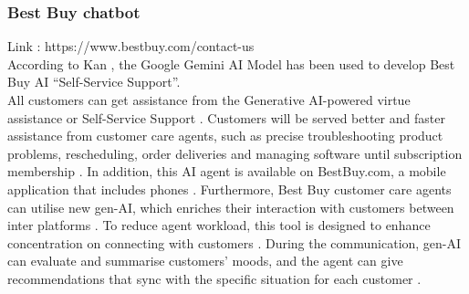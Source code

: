 \documentclass[12pt,a4paper]{article}
\begin{document}
\subsubsection{Best Buy chatbot}
\noindent Link : https://www.bestbuy.com/contact-us\\
\noindent According to Kan \citep{question_3.6}, the Google Gemini AI Model has been used to develop Best Buy AI “Self-Service Support”. \\

\noindent All customers can get assistance from the Generative AI-powered virtue assistance or  Self-Service Support \citep{question_3.5}. Customers will be served better and faster assistance from customer care agents, such as precise troubleshooting product problems, rescheduling, order deliveries and managing software until subscription membership \citep{question_3.5}. In addition, this AI agent is available on BestBuy.com, a mobile application that includes phones \citep{question_3.6}. Furthermore, Best Buy customer care agents can utilise new gen-AI, which enriches their interaction with customers between inter platforms \citep{question_3.7}. To reduce agent workload, this tool is designed to enhance concentration on connecting with customers \citep{question_3.7}. During the communication, gen-AI can evaluate and summarise customers' moods, and the agent can give recommendations that sync with the specific situation for each customer \citep{question_3.7}. \\






\pagebreak



	
\def\UrlBreaks{\do\/\do-}

\clearpage
\end{document}
